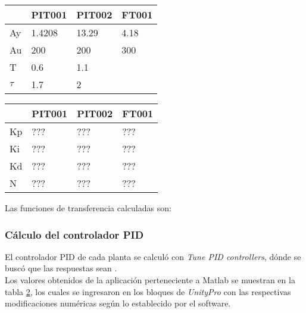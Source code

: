 	\begin{table}[h]
 \begin{minipage}{\linewidth}
	\centering
	\begin{minipage}{0.45\linewidth}
			\centering
			\begin{tabular}{|l|l|l|l|}
				\hline
				& PIT001 & PIT002 & FT001 \\ \hline
				Ay & 1.4208 & 13.29 & 4.18 \\ \hline
				Au & 200 & 200 & 300 \\ \hline
				T & 0.6 & 1.1 &  \\ \hline
				$\tau$ & 1.7 & 2 & \\ \hline
			\end{tabular}
			\label{tab:parametros}
	
	\end{minipage}
	\hspace{0.05\linewidth}
	\begin{minipage}{0.45\linewidth}
			\centering
			\begin{tabular}{|l|l|l|l|}
				\hline
				& PIT001 & PIT002 & FT001 \\ \hline
				Kp & ??? & ??? & ??? \\ \hline
				Ki & ??? & ??? & ??? \\ \hline
				Kd & ??? & ??? & ??? \\ \hline
				N & ??? & ??? & ??? \\ \hline
			\end{tabular}
				\label{tab:pid}
	\end{minipage}
\end{minipage}

		\end{table}


Las funciones de transferencia calculadas son:

\subsubsection{Cálculo del controlador PID}
El controlador PID de cada planta se calculó con \textit{Tune PID controllers}, dónde se buscó que las respuestas sean .\\

Los valores obtenidos de la aplicación perteneciente a Matlab se muestran en la tabla \ref{tab:pid}, los cuales se ingresaron en los bloques de \textit{UnityPro} con las respectivas modificaciones numéricas según lo establecido por el software.

